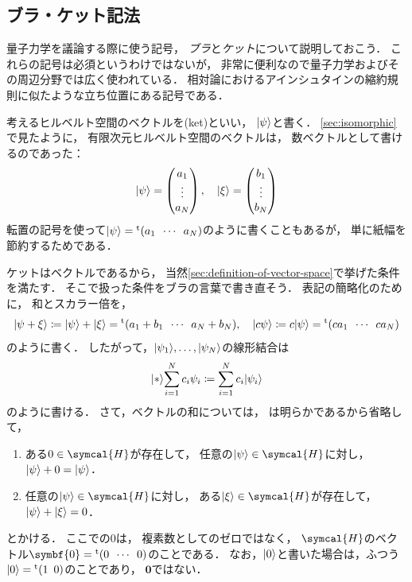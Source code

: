 \documentclass[
]{sotsu}
\begin{document}
\subsection{ブラ・ケット記法}
\label{sec:bra-ket}

量子力学を議論する際に使う記号，
\emph{ブラ}と\emph{ケット}について説明しておこう．
これらの記号は必須というわけではないが，
非常に便利なので量子力学およびその周辺分野では広く使われている．
相対論におけるアインシュタインの縮約規則に似たような立ち位置にある記号である．

考えるヒルベルト空間のベクトルを(ket)といい，
$\ket{\psi}$と書く．
\cref{sec:isomorphic}で見たように，
有限次元ヒルベルト空間のベクトルは，
数ベクトルとして書けるのであった：
\begin{equation*}
    \ket{\psi} = 
    \begin{pmatrix}
        a_1  \\  \vdots  \\  a_N
    \end{pmatrix}
    ,
    \quad
    \ket{\xi} = 
    \begin{pmatrix}
        b_1  \\  \vdots  \\  b_N
    \end{pmatrix}
\end{equation*}
転置の記号を使って$\ket{\psi} = \cvector{a_1 ; \cdots ; a_N}$のように書くこともあるが，
単に紙幅を節約するためである．

ケットはベクトルであるから，
当然\cref{sec:definition-of-vector-space}で挙げた条件を満たす．
そこで扱った条件をブラの言葉で書き直そう．
表記の簡略化のために，
和とスカラー倍を，
\begin{equation*}
    \ket{\psi + \xi} \coloneq \ket{\psi} + \ket{\xi}
    = \cvector{ a_1 + b_1 ; \cdots ; a_N + b_N }
    ,
    \quad 
    \ket{c \psi} \coloneq c \ket{\psi}
    = \cvector{c a_1; \cdots; c a_N}
\end{equation*}
のように書く．
したがって，$\ket{\psi_1}, \dots, \ket{\psi_N}$の線形結合は
\begin{equation*}
    \ket*{\sum_{i = 1}^{N} c_i \psi_i}
        \coloneq \sum_{i = 1}^{N} c_i \ket{\psi_i}
\end{equation*}
のように書ける．
さて，ベクトルの和については，
は明らかであるから省略して，
\begin{enumerate}
    \item[\labelcref*{vector:sum-zero}]
        ある$0 \in \symcal{H}$が存在して，
        任意の$\ket{\psi} \in \symcal{H}$に対し，
        $\ket{\psi} + 0 = \ket{\psi}$．
    \item[\labelcref*{vector:sum-opposite}]
        任意の$\ket{\psi} \in \symcal{H}$に対し，
        ある$\ket{\xi} \in \symcal{H}$が存在して，
        $\ket{\psi} + \ket{\xi} = 0$．
\end{enumerate}
とかける．
ここでの$0$は，
複素数としてのゼロではなく，
$\symcal{H}$のベクトル$\symbf{0} = \cvector{0 ; \cdots ; 0}$のことである．
なお，$\ket{0}$と書いた場合は，ふつう$\ket{0} = \cvector{1 ; 0}$のことであり，
$\symbf{0}$ではない．
\end{document}
